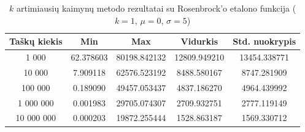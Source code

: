 \begin{table}[H]
    \centering
    \begin{tabular}{|c|c|c|c|c|}
        \hline
        \textbf{Taškų kiekis} & \textbf{Min} & \textbf{Max} & \textbf{Vidurkis} & \textbf{Std. nuokrypis} \\ \hline
        1 000        & 62.378603 & 80198.842132 & 12809.949210 & 13454.338771 \\ \hline
        10 000       & 7.909118 & 62576.523192 & 8488.580167 & 8747.281909 \\ \hline
        100 000      & 0.189090 & 49457.053437 & 4837.186270 & 4964.439992 \\ \hline
        1 000 000    & 0.001983 & 29705.074307 & 2709.932751 & 2777.119149 \\ \hline
        10 000 000   & 0.000203 & 19872.255444 & 1528.863187 & 1569.330712 \\ \hline
    \end{tabular}
    \caption{$k$ artimiausių kaimynų metodo rezultatai su Rosenbrock'o etalono funkcija ($k = 1$, $\mu = 0$, $\sigma = 5$)}
\end{table}